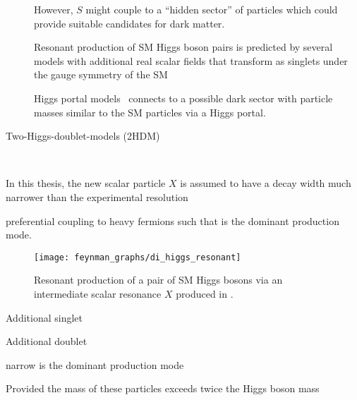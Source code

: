 \begin{description}
  However, $S$ might couple to a ``hidden sector'' of
  particles which could provide suitable candidates for dark matter.


  Resonant production of SM Higgs boson pairs is predicted by several models
  with additional real scalar fields that transform as singlets under the gauge
  symmetry of the
  SM~\cite{Schabinger:2005ei,Bowen:2007ia,Barger:2007im,Dolan:2012ac,No:2013wsa,Chen:2014ask,Robens:2016xkb}

  Higgs portal models~\cite{Patt:2006fw} connects to a possible dark sector with
  particle masses similar to the SM particles via a Higgs portal.




\item[Two-Higgs-doublet-models (2HDM)]

\end{description}

~\cite{DiMicco:2019ngk}

In this thesis, the new scalar particle $X$ is assumed to have a decay width
much narrower than the experimental resolution

preferential coupling to heavy fermions such that \ggF is the dominant
production mode.


\begin{figure}[htbp]
  \centering

  \texttt{[image: feynman\_graphs/di\_higgs\_resonant]}

  \caption{Resonant production of a pair of SM Higgs bosons via an intermediate
    scalar resonance $X$ produced in \ggF.}%
  \label{fig:resonant_production_feyn}
\end{figure}







Additional singlet

Additional doublet




narrow \ggF is the dominant production mode








Provided the mass of these
particles exceeds twice the Higgs boson mass









